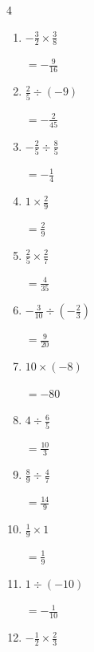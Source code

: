 \begin{multicols}{4}
\begin{enumerate}
        $\displaystyle =-\frac{5}{28}$

  \item $\displaystyle -\frac{3}{2}\times{}\frac{3}{8}$

        $\displaystyle =-\frac{9}{16}$

  \item $\displaystyle \frac{2}{5}\div{}\left(-9\right)$

        $\displaystyle =-\frac{2}{45}$

  \item $\displaystyle -\frac{2}{5}\div{}\frac{8}{5}$

        $\displaystyle =-\frac{1}{4}$

  \item $\displaystyle 1\times{}\frac{2}{9}$

        $\displaystyle =\frac{2}{9}$

  \item $\displaystyle \frac{2}{5}\times{}\frac{2}{7}$

        $\displaystyle =\frac{4}{35}$

  \item $\displaystyle -\frac{3}{10}\div{}\left(-\frac{2}{3}\right)$

        $\displaystyle =\frac{9}{20}$

  \item $\displaystyle 10\times{}\left(-8\right)$

        $\displaystyle =-80$

  \item $\displaystyle 4\div{}\frac{6}{5}$

        $\displaystyle =\frac{10}{3}$

  \item $\displaystyle \frac{8}{9}\div{}\frac{4}{7}$

        $\displaystyle =\frac{14}{9}$

\columnbreak %

\resetques

  \item $\displaystyle \frac{1}{9}\times{}1$

        $\displaystyle =\frac{1}{9}$

  \item $\displaystyle 1\div{}\left(-10\right)$

        $\displaystyle =-\frac{1}{10}$

  \item $\displaystyle -\frac{1}{2}\times{}\frac{2}{3}$


\end{enumerate}
\end{multicols}
